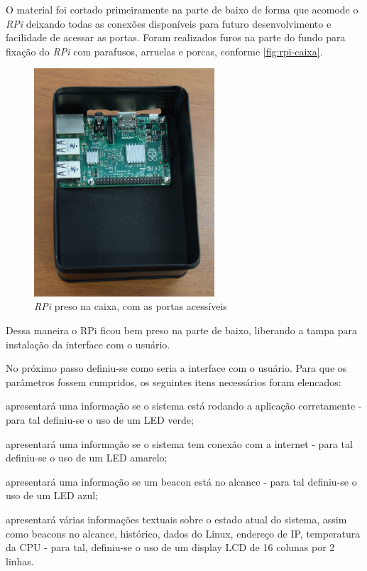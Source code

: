 \documentclass[
		12pt,				%
		openright,			%
		oneside,			%
		a4paper,			%
		chapter=TITLE,		%
		english,			%
		brazil				%
	]{abntex2}
\begin{document}
O material foi cortado primeiramente na parte de baixo de forma que acomode o \textit{RPi} deixando todas as conexões disponíveis para futuro desenvolvimento e facilidade de acessar as portas. Foram realizados furos na parte do fundo para fixação do \textit{RPi} com parafusos, arruelas e porcas, conforme \autoref{fig:rpi-caixa}.


\begin{figure}[htb]
	\caption{\label{fig:rpi-caixa}\textit{RPi} preso na caixa, com as portas acessíveis}
	\begin{center}
		\includegraphics[width=0.6\textwidth]{img/rpi-caixa.jpg}
	\end{center}
\end{figure}

Dessa maneira o RPi ficou bem preso na parte de baixo, liberando a tampa para instalação da interface com o usuário.

No próximo passo definiu-se como seria a interface com o usuário. Para que os parâmetros fossem cumpridos, os seguintes itens necessários foram elencados:

\begin{alineas}
	\item apresentará uma informação se o sistema está rodando a aplicação corretamente - para tal definiu-se o uso de um LED verde;
	\item apresentará uma informação se o sistema tem conexão com a internet - para tal definiu-se o uso de um LED amarelo;
	\item apresentará uma informação se um beacon está no alcance - para tal definiu-se o uso de um LED azul;
	\item apresentará várias informações textuais sobre o estado atual do sistema, assim como beacons no alcance, histórico, dados do Linux, endereço de IP, temperatura da CPU - para tal, definiu-se o uso de um display LCD de 16 colunas por 2 linhas.
\end{alineas}
\end{document}
